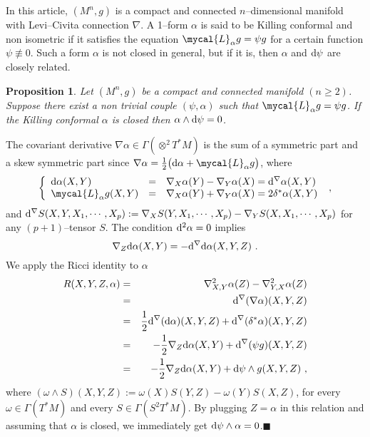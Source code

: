 \documentclass[a4paper,11pt,leqno]{amsart}
\numberwithin{equation}{section}
\theoremstyle{main}
\newtheorem{prop} [thm] {\bf  Proposition}
\begin{document}
In this article, $(M^n,g)$ is a compact and connected $n$--dimensional manifold with Levi--Civita connection $\nabla$. A 1--form $\alpha$ is said to be Killing conformal and non isometric if it satisfies the equation $\mycal{L}_\alpha g=\psi g $ for a certain function $\psi\not\equiv 0$. Such a form $\alpha$ is not closed in general, but if it is, then $\alpha$ and ${{\rm d}} \psi$ are closely related.
\begin{prop}
Let $(M^n, g)$ be a compact and connected manifold $(n\ge 2)$. Suppose there exist a non trivial couple $(\psi,\alpha)$ such that $\mycal{L}_\alpha g=\psi g$. If the Killing conformal $\alpha$ is closed then $\alpha \wedge {{\rm d}} \psi=0$.
\end{prop}
\proof The covariant derivative $\nabla\alpha\in \Gamma(\otimes^2 T^*M)$ is the sum of a symmetric part and a skew symmetric part since $\nabla\alpha= \frac{1}{2} \big({{\rm d}} \alpha + \mycal{L}_\alpha g\big)$, where
\begin{equation*}
	   \left\{
\begin{array}{lll}
	{{\rm d}} \alpha(X,Y) &=&   \nabla_X \alpha(Y) - \nabla_Y \alpha(X) = {{\rm d}}^\nabla \alpha (X,Y) \\
	\mycal{L}_\alpha g (X,Y)&=&  \nabla_X \alpha(Y) + \nabla_Y \alpha(X) = 2\delta^\ast \alpha (X,Y) 
\end{array}\right. \ ,
\end{equation*}
and ${{\rm d}}^{\nabla}S(X,Y,X_1,\cdots,X_p):= \nabla_X S(Y,X_1,\cdots,X_p)- \nabla_Y S(X,X_1,\cdots,X_p)$ for any ${(p+1)}$--tensor $S$. The condition ${{\rm d}}^2 \alpha =0$ implies
\begin{equation*}
	\nabla_Z {{\rm d}} \alpha (X,Y) = - {{\rm d}}^\nabla {{\rm d}} \alpha (X,Y,Z) \ .
\end{equation*}
We apply the Ricci identity to $\alpha$
\begin{eqnarray*}
	R(X,Y,Z,\alpha) &=&  \nabla^2_{X,Y} \alpha(Z) -  \nabla^2_{Y,X} \alpha(Z) \\
	&=& {{\rm d}}^\nabla (\nabla\alpha) (X,Y,Z) \\
	&=& \frac{1}{2}{{\rm d}}^\nabla ({{\rm d}} \alpha) (X,Y,Z)  + {{\rm d}}^\nabla (\delta^\ast \alpha) (X,Y,Z) \\
	&=& - \frac{1}{2}\nabla_Z {{\rm d}} \alpha (X,Y) +  {{\rm d}}^\nabla(\psi g)(X,Y,Z) \\
	&=& - \frac{1}{2}\nabla_Z {{\rm d}} \alpha (X,Y) +  {{\rm d}} \psi \wedge g (X,Y,Z) \ ,
\end{eqnarray*}
where $(\omega \wedge S) (X,Y,Z):= \omega(X)S(Y,Z)- \omega(Y)S(X,Z)$, for every $\omega\in \Gamma(T^*M)$ and every $S\in\Gamma(S^2T^*M)$. By plugging $Z=\alpha$ in this relation and assuming that $\alpha$ is closed, we immediately get $ {{\rm d}} \psi \wedge \alpha=0$.{\hfill $\blacksquare$ \medskip \\}
\end{document}
